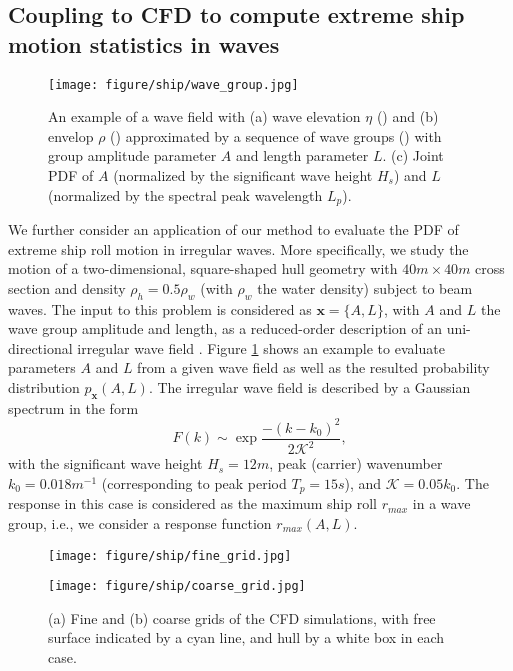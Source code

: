 \documentclass[11pt]{article}
\begin{document}
\subsection{Coupling to CFD to compute extreme ship motion statistics in waves}
\begin{figure}
    \centering
    \texttt{[image: figure/ship/wave\_group.jpg]}
    \caption{An example of a wave field with (a) wave elevation $\eta$ (\orangeline) and (b) envelop $\rho$ (\blackdashedline) approximated by a sequence of wave groups (\redline) with group amplitude parameter $A$ and length parameter $L$. (c) Joint PDF of $A$ (normalized by the significant wave height $H_s$) and $L$ (normalized by the spectral peak wavelength $L_p$).}
    \label{fig:wave_group}
\end{figure}

We further consider an application of our method to evaluate the PDF of extreme ship roll motion in irregular waves. More specifically, we study the motion of a two-dimensional, square-shaped hull geometry with $40m\times40m$ cross section and density $\rho_h=0.5\rho_w$ (with $\rho_w$ the water density) subject to beam waves. The input to this problem is considered as $\mathbf{x} = \{A,L\}$, with $A$ and $L$ the wave group amplitude and length, as a reduced-order description of an uni-directional irregular wave field \cite{cousins2016reduced, gong2021full}. Figure \ref{fig:wave_group} shows an example to evaluate parameters $A$ and $L$ from a given wave field as well as the resulted probability distribution $p_\mathbf{x}(A,L)$. The irregular wave field is described by a Gaussian spectrum in the form
\begin{equation}
F(k)\sim \exp \frac{-(k-k_0)^2}{2\mathcal{K}^2},  
\label{spectrum}
\end{equation}
with the significant wave height $H_s=12m$, peak (carrier) wavenumber $k_0=0.018 m^{-1}$ (corresponding to peak period $T_p=15s$), and $\mathcal{K}=0.05k_0$. The response in this case is considered as the maximum ship roll $r_{max}$ in a wave group, i.e., we consider a response function $r_{max}(A,L)$.




\begin{figure}
    \centering
    \begin{minipage}[b]{0.48\linewidth}
    \texttt{[image: figure/ship/fine\_grid.jpg]}
    \end{minipage}
    \begin{minipage}[b]{0.48\linewidth}
    \texttt{[image: figure/ship/coarse\_grid.jpg]}
    \end{minipage}
    \centering
    \caption{(a) Fine and (b) coarse grids of the CFD simulations, with free surface indicated by a cyan line, and hull by a white box in each case.}
    \label{fig:cfd_schematic}
\end{figure}
\end{document}
